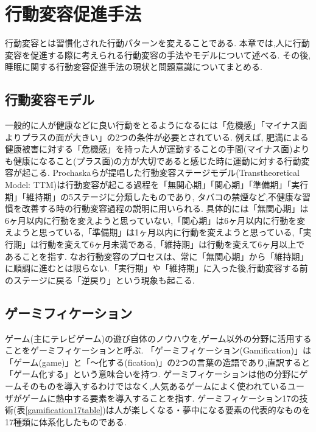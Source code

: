 \chapter{行動変容促進手法}
行動変容とは習慣化された行動パターンを変えることである.
本章では,人に行動変容を促進する際に考えられる行動変容の手法やモデルについて述べる.
その後,睡眠に関する行動変容促進手法の現状と問題意識についてまとめる.

\section{行動変容モデル}
一般的に人が健康などに良い行動をとるようになるには「危機感」「マイナス面よりプラスの面が大きい」の2つの条件が必要とされている.
例えば, 肥満による健康被害に対する「危機感」を持った人が運動することの手間(マイナス面)よりも健康になること(プラス面)の方が大切であると感じた時に運動に対する行動変容が起こる.
Prochaskaらが提唱した行動変容ステージモデル(Transtheoretical Model: TTM)\cite{TTM}は行動変容が起こる過程を「無関心期」「関心期」「準備期」「実行期」「維持期」の5ステージに分類したものであり, タバコの禁煙など,不健康な習慣を改善する時の行動変容過程の説明に用いられる.
具体的には「無関心期」は6ヶ月以内に行動を変えようと思っていない,「関心期」は6ヶ月以内に行動を変えようと思っている,「準備期」は1ヶ月以内に行動を変えようと思っている,「実行期」は行動を変えて6ヶ月未満である,「維持期」は行動を変えて6ヶ月以上であることを指す.
なお行動変容のプロセスは、常に「無関心期」から「維持期」に順調に進むとは限らない.「実行期」や「維持期」に入った後,行動変容する前のステージに戻る「逆戻り」という現象も起こる.

\section{ゲーミフィケーション}
ゲーム(主にテレビゲーム)の遊び自体のノウハウを,ゲーム以外の分野に活用することをゲーミフィケーションと呼ぶ.
「ゲーミフィケーション(Gamification)」は「ゲーム(game)」と「〜化する(fication)」の2つの言葉の造語であり,直訳すると「ゲーム化する」という意味合いを持つ.
ゲーミフィケーションは他の分野にゲームそのものを導入するわけではなく,人気あるゲームによく使われているユーザがゲームに熱中する要素を導入することを指す.
ゲーミフィケーション17の技術\cite{gamification17}(表\ref{gamification17table})は人が楽しくなる・夢中になる要素の代表的なものを17種類に体系化したものである.

